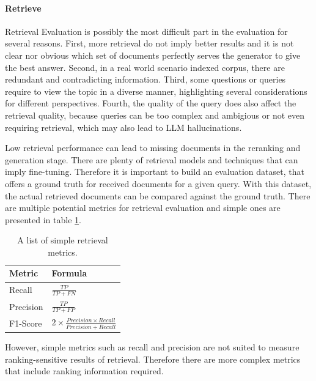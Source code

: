 \paragraph{Retrieve}
Retrieval Evaluation is possibly the most difficult part in the evaluation for several reasons. First, more retrieval do not imply better results and it is not clear nor obvious which set of documents perfectly serves the generator to give the best answer.\cite{Jin.5222024} Second, in a real world scenario indexed corpus, there are redundant and contradicting information.\cite{Yu.2024} Third, some questions or queries require to view the topic in a diverse manner, highlighting several considerations for different perspectives. Fourth, the quality of the query does also affect the retrieval quality, because queries can be too complex and ambigious or not even requiring retrieval, which may also lead to LLM hallucinations.\cite{Huang.2023, Mallen.20.12.2022}

Low retrieval performance can lead to missing documents in the reranking and generation stage. There are plenty of retrieval models and techniques that can imply fine-tuning. Therefore it is important to build an evaluation dataset, that offers a ground truth for received documents for a given query. With this dataset, the actual retrieved documents can be compared against the ground truth.\cite{Ferrante.2021} There are multiple potential metrics for retrieval evaluation and simple ones are presented in table \ref{table:simpleretrievalmetrics}. 

{\renewcommand{\arraystretch}{1.5}%
\begin{table}
  \centering
 \begin{tabular}{|l|l|}
  \hline
  \textbf{Metric} & \textbf{Formula} \\[3pt]

  \hline Recall & $\frac{TP}{TP + FN}$\\[2pt]
  
  \hline Precision & $\frac{TP}{TP + FP}$\\[5pt]
  
  \hline F1-Score & $2 \times \frac{Precision \times Recall}{Precision + Recall}$\\[2pt]
  
  \hline
 \end{tabular}
 \caption{A list of simple retrieval metrics.}
 \label{table:simpleretrievalmetrics}
\end{table}}

However, simple metrics such as recall and precision are not suited to measure ranking-sensitive results of retrieval.\cite{SaadFalcon.16.11.2023} Therefore there are more complex metrics that include ranking information required.

